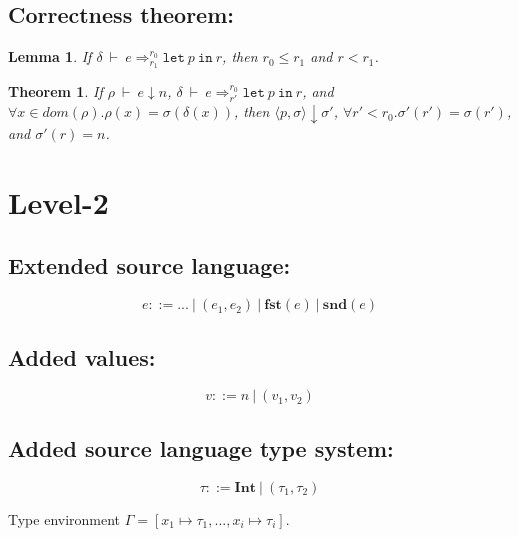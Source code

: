 \documentclass[a4paper]{article}
\newtheorem{thm}[equation]{Theorem}
\newtheorem{lem}[equation]{Lemma}
\def\Fst#1{\mathbf{fst} (#1)}
\def\Snd#1{\mathbf{snd} (#1)}
\def\Int{\mathbf{Int}}
\def\Eva{\downarrow}
\def\Ra{\Rightarrow}
\def\Env{\ \vdash\ }
\def\Sgm{\sigma}
\def\Map#1#2{#1 \mapsto #2}
\def\Eval#1#2#3{#1 \Env #2 \Eva #3 }
\def\TaSem#1#2#3{\langle #1,#2 \rangle \Eva #3}
\def\Talet#1#2{\mathtt{let} \ #1 \ \mathtt{in} \ #2}
\def\Trans#1#2#3#4#5{#1 \Env #2 \Ra^{#4}_{#5} #3}
\begin{document}
\subsection{Correctness theorem: }

\begin{lem}
	If $\Trans{\delta}{e}{\Talet{p}{r}}{r_0}{r_1}$, then $r_0 \le r_1$ and $r < r_1$.
	\label{fresh1}
\end{lem}

\begin{thm}
	If $\Eval{\rho}{e}{n}$, $\Trans{\delta}{e}{\Talet{p}{r}} {r_0} {r'}$, and $\forall x \in dom(\rho).\rho(x) = \Sgm(\delta(x))$,
	then $\TaSem{p}{\Sgm}{\Sgm'}$, $\forall r' < r_0.\Sgm'(r') = \Sgm(r') $, and $\Sgm'(r) = n$. 
\end{thm}


\section{Level-2}
\subsection{Extended source language:}
$$e ::= ... \ |\ (e_1,e_2) \ |\ \Fst{e} \ |\ \Snd{e}$$

\subsection{Added values:}

$$v ::= n \ | \ (v_1,v_2) $$

\subsection{Added source language type system:}
$$ \tau ::= \Int \ | \ (\tau_1,\tau_2) $$

Type environment $\Gamma = [\Map{x_1}{\tau_1}, ..., \Map{x_i}{\tau_i} ]$.
\end{document}
